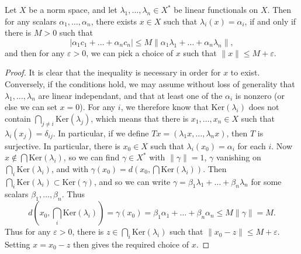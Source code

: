\begin{theorem}[Helly]
    Let $X$ be a norm space, and let $\lambda_1,\dots,\lambda_n \in X^*$ be linear functionals on $X$. Then for any scalars $\alpha_1,\dots,\alpha_n$, there exists $x \in X$ such that $\lambda_i(x) = \alpha_i$, if and only if there is $M > 0$ such that
    \[ |\alpha_1 c_1 + \dots + \alpha_n c_n | \leq M \| \alpha_1 \lambda_1 + \dots + \alpha_n \lambda_n \|, \]
    and then for any $\varepsilon > 0$, we can pick a choice of $x$ such that $\| x \| \leq M + \varepsilon$.
\end{theorem}
\begin{proof}
    It is clear that the inequality is necessary in order for $x$ to exist. Conversely, if the conditions hold, we may assume without loss of generality that $\lambda_1, \dots, \lambda_n$ are linear independant, and that at least one of the $\alpha_i$ is nonzero (or else we can set $x = 0$). For any $i$, we therefore know that $\text{Ker}(\lambda_i)$ does not contain $\bigcap_{j \neq i} \text{Ker}(\lambda_j)$, which means that there is $x_1, \dots, x_n \in X$ such that $\lambda_i(x_j) = \delta_{ij}$. In particular, if we define $Tx = (\lambda_1 x, \dots, \lambda_n x)$, then $T$ is surjective. In particular, there is $x_0 \in X$ such that $\lambda_i(x_0) = \alpha_i$ for each $i$. Now $x \not \in \bigcap \text{Ker}(\lambda_i)$, so we can find $\gamma \in X^*$ with $\| \gamma \| = 1$, $\gamma$ vanishing on $\bigcap_i \text{Ker}(\lambda_i)$, and with $\gamma(x_0) = d(x_0,\bigcap \text{Ker}(\lambda_i))$. Then $\bigcap_i \text{Ker}(\lambda_i) \subset \text{Ker}(\gamma)$, and so we can write $\gamma = \beta_1 \lambda_1 + \dots + \beta_n \lambda_n$ for some scalars $\beta_1,\dots,\beta_n$. Thus
    \[ d(x_0, \bigcap_i \text{Ker}(\lambda_i)) = \gamma(x_0) = \beta_1 \alpha_1 + \dots + \beta_n \alpha_n \leq M \| \gamma \| = M. \]
    Thus for any $\varepsilon > 0$, there is $z \in \bigcap_i \text{Ker}(\lambda_i)$ such that $\| x_0 - z \| \leq M + \varepsilon$. Setting $x = x_0 - z$ then gives the required choice of $x$.
\end{proof}

